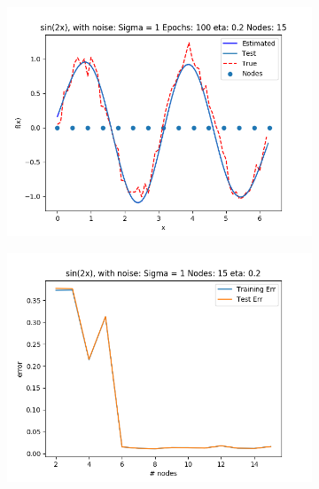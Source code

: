\documentclass{article}
\begin{document}
\begin{figure}[ht!]
    \centering
    \begin{subfigure}[t]{0.4\textwidth}
        \centering
        \includegraphics[width=1\textwidth]{plots/noise/seq_sin2x_100ep_sigma1}
        \caption{}
    \end{subfigure}
    \begin{subfigure}[t]{0.4\textwidth}
        \centering
        \includegraphics[width=1\textwidth]{plots/noise/seq_sin2x_100ep_sigma1_error}
        \caption{}
    \end{subfigure}
    \begin{subfigure}[t]{0.4\textwidth}

\end{subfigure}
\end{figure}
\end{document}
